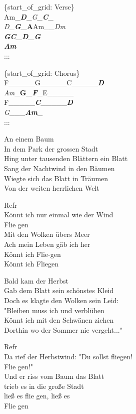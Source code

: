 \documentclass[
  letterpaper,
]{scrbook}
\begin{document}
\{start\_of\_grid: Verse\}\\
Am\_\textbf{\emph{\textbar D}}\_\emph{\textbar G}\_\textbf{\emph{\textbar C}}\_\emph{\textbar{}\\
D}\_\textbf{\emph{\textbar G}\_A}\textbar Am\_\emph{\textbf{\textbar{}}\_Dm}\textbar{}\\
\emph{\textbf{G}\textbar{}\textbf{\emph{C\textbf{\textbar{}}\_D\textbf{\textbar{}}\_G\textbf{\textbar{}\\
Am\textbar{}}}}}\textbar{}\\
:::

\{start\_of\_grid: Chorus\}\\
F\_\_\_\_\_\textbar G\_\_\_\_\_\textbar C\_\_\_\_\_\textbar{}\emph{\textbf{D}\textbar{}\\
Am}\_\textbf{\textbar G\_\emph{F\textbf{\textbar{}}}}\_\textbar E\_\_\_\_\_\textbar{}\\
F\_\_\_\_\_\textbar{}\emph{\textbf{C}\textbar{}}\_\_\_\_\_\textbar{}\emph{\textbf{D}\textbar{}\\
G}\_\textbf{\emph{\textbar{}}}\_\textbf{\textbar{}}\_\textbf{\emph{\textbar Am}}\_\textbar{}\\
:::

An einem Baum\\
In dem Park der grossen Stadt\\
Hing unter tausenden Blättern ein Blatt\\
Sang der Nachtwind in den Bäumen\\
Wiegte sich das Blatt in Träumen\\
Von der weiten herrlichen Welt

Refr\\
Könnt ich nur einmal wie der Wind\\
Flie gen\\
Mit den Wolken übers Meer\\
Ach mein Leben gäb ich her\\
Könnt ich Flie-gen\\
Könnt ich Fliegen

Bald kam der Herbst\\
Gab dem Blatt sein schönstes Kleid\\
Doch es klagte den Wolken sein Leid:\\
"Bleiben muss ich und verblühen\\
Könnt ich mit den Schwänen ziehen\\
Dorthin wo der Sommer nie vergeht..."

Refr\\
Da rief der Herbstwind: "Du sollst fliegen!\\
Flie gen!"\\
Und er riss vom Baum das Blatt\\
trieb es in die große Stadt\\
ließ es flie gen, ließ es\\
Flie gen
\end{document}
